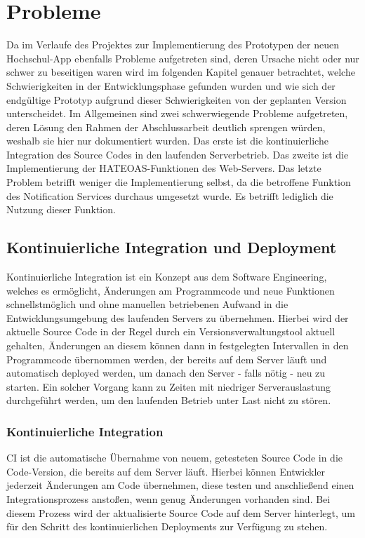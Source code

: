 \chapter{Probleme}
\label{sec:probleme}

Da im Verlaufe des Projektes zur Implementierung des Prototypen der neuen Hoch\-schul-\ac{App} ebenfalls Probleme aufgetreten sind, deren Ursache nicht oder nur schwer zu beseitigen waren wird im folgenden Kapitel genauer betrachtet, welche Schwierigkeiten in der Entwicklungsphase gefunden wurden und wie sich der endgültige Prototyp aufgrund dieser Schwierigkeiten von der geplanten Version unterscheidet. Im Allgemeinen sind zwei schwerwiegende Probleme aufgetreten, deren Lösung den Rahmen der Abschlussarbeit deutlich sprengen würden, weshalb sie hier nur dokumentiert wurden. Das erste ist die kontinuierliche Integration des Source Codes in den laufenden Serverbetrieb. Das zweite ist die Implementierung der \ac{HATEOAS}-Funktionen des Web-Servers. Das letzte Problem betrifft weniger die Implementierung selbst, da die betroffene Funktion des Notification Services durchaus umgesetzt wurde. Es betrifft lediglich die Nutzung dieser Funktion.

\section{Kontinuierliche Integration und Deployment}

Kontinuierliche Integration ist ein Konzept aus dem Software Engineering, welches es ermöglicht, Änderungen am Programmcode und neue Funktionen schnellstmöglich und ohne manuellen betriebenen Aufwand in die Entwicklungsumgebung des laufenden Servers zu übernehmen. Hierbei wird der aktuelle Source Code in der Regel durch ein Versionsverwaltungstool aktuell gehalten, Änderungen an diesem können dann in festgelegten Intervallen in den Programmcode übernommen werden, der bereits auf dem Server läuft und automatisch deployed werden, um danach den Server - falls nötig - neu zu starten. Ein solcher Vorgang kann zu Zeiten mit niedriger Serverauslastung durchgeführt werden, um den laufenden Betrieb unter Last nicht zu stören.

\subsection*{Kontinuierliche Integration}

\ac{CI} ist die automatische Übernahme von neuem, getesteten Source Code in die Code-Version, die bereits auf dem Server läuft. Hierbei können Entwickler jederzeit Änderungen am Code übernehmen, diese testen und anschließend einen Integrationsprozess anstoßen, wenn genug Änderungen vorhanden sind. Bei diesem Prozess wird der aktualisierte Source Code auf dem Server hinterlegt, um für den Schritt des kontinuierlichen Deployments zur Verfügung zu stehen.

